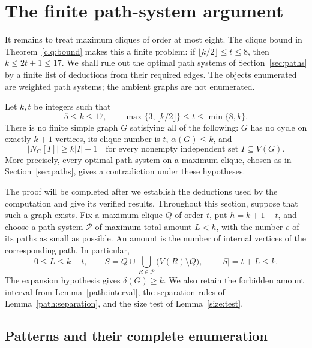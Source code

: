 \section{The finite path-system argument}\label{sec:finite}

It remains to treat maximum cliques of order at most eight.  The clique
bound in Theorem~\ref{clq:bound} makes this a finite problem: if
$\lfloor k/2\rfloor\le t\le8$, then $k\le2t+1\le17$.
We shall rule out the optimal path systems of Section~\ref{sec:paths}
by a finite list of deductions from their required edges.  The objects
enumerated are weighted path systems; the ambient graphs are not
enumerated.

\begin{proposition}\label{finite:verified}
Let $k,t$ be integers such that
\begin{equation}\label{finite:domain}
 5\le k\le17,\qquad
 \max\{3,\lfloor k/2\rfloor\}\le t\le\min\{8,k\}.
\end{equation}
There is no finite simple graph $G$ satisfying all of the following:
$G$ has no cycle on exactly $k+1$ vertices, its clique number is $t$,
$\alpha(G)\le k$, and
\[
 |N_G[I]|\ge k|I|+1
 \quad\text{for every nonempty independent set }I\subseteq V(G).
\]
More precisely, every optimal path system on a maximum clique, chosen
as in Section~\ref{sec:paths}, gives a contradiction under these
hypotheses.
\end{proposition}

The proof will be completed after we establish the deductions used by
the computation and give its verified results.  Throughout this section,
suppose that such a graph exists.  Fix a maximum clique $Q$ of order $t$,
put $h=k+1-t$, and choose a path system $\mathcal P$ of maximum total
amount $L<h$, with the number $e$ of its paths as small as possible.
An amount is the number of internal vertices of the corresponding path.
In particular,
\begin{equation}\label{finite:budget}
 0\le L\le k-t,\qquad
 S=Q\cup\bigcup_{R\in\mathcal P}\bigl(V(R)\setminus Q\bigr),
 \qquad |S|=t+L\le k.
\end{equation}
The expansion hypothesis gives $\delta(G)\ge k$.  We also retain the
forbidden amount interval from Lemma~\ref{path:interval}, the separation
rules of Lemma~\ref{path:separation}, and the size test of
Lemma~\ref{size:test}.

\subsection{Patterns and their complete enumeration}

